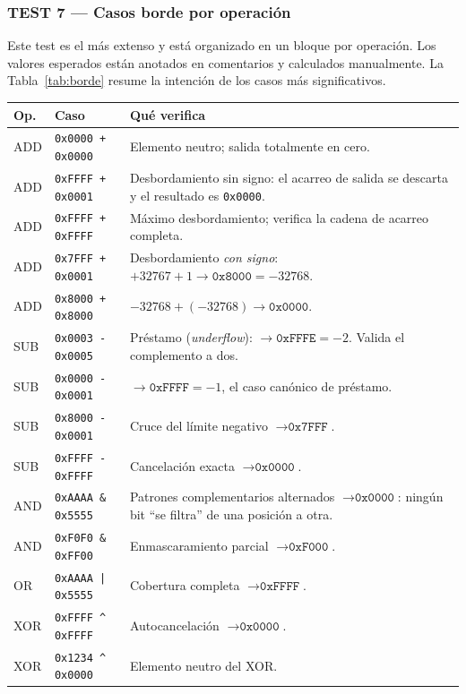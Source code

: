 \documentclass[12pt,a4paper]{article}
\begin{document}
\subsubsection{TEST 7 --- Casos borde por operación}

Este test es el más extenso y está organizado en un bloque por operación. Los
valores esperados están anotados en comentarios y calculados manualmente. La
Tabla~\ref{tab:borde} resume la intención de los casos más significativos.

\begin{longtable}{llp{7.4cm}}
  \toprule
  \textbf{Op.} & \textbf{Caso} & \textbf{Qué verifica} \\
  \midrule
  \endhead
  ADD & \texttt{0x0000 + 0x0000} & Elemento neutro; salida totalmente en cero. \\
  ADD & \texttt{0xFFFF + 0x0001} & Desbordamiento sin signo: el acarreo de salida se descarta y el resultado es \texttt{0x0000}. \\
  ADD & \texttt{0xFFFF + 0xFFFF} & Máximo desbordamiento; verifica la cadena de acarreo completa. \\
  ADD & \texttt{0x7FFF + 0x0001} & Desbordamiento \emph{con signo}: $+32767 + 1 \to \texttt{0x8000} = -32768$. \\
  ADD & \texttt{0x8000 + 0x8000} & $-32768 + (-32768) \to \texttt{0x0000}$. \\
  \midrule
  SUB & \texttt{0x0003 - 0x0005} & Préstamo (\emph{underflow}): $\to \texttt{0xFFFE} = -2$. Valida el complemento a dos. \\
  SUB & \texttt{0x0000 - 0x0001} & $\to \texttt{0xFFFF} = -1$, el caso canónico de préstamo. \\
  SUB & \texttt{0x8000 - 0x0001} & Cruce del límite negativo $\to \texttt{0x7FFF}$. \\
  SUB & \texttt{0xFFFF - 0xFFFF} & Cancelación exacta $\to \texttt{0x0000}$. \\
  \midrule
  AND & \texttt{0xAAAA \& 0x5555} & Patrones complementarios alternados $\to \texttt{0x0000}$: ningún bit ``se filtra'' de una posición a otra. \\
  AND & \texttt{0xF0F0 \& 0xFF00} & Enmascaramiento parcial $\to \texttt{0xF000}$. \\
  OR  & \texttt{0xAAAA | 0x5555} & Cobertura completa $\to \texttt{0xFFFF}$. \\
  XOR & \texttt{0xFFFF \^{} 0xFFFF} & Autocancelación $\to \texttt{0x0000}$. \\
  XOR & \texttt{0x1234 \^{} 0x0000} & Elemento neutro del XOR. \\

\end{longtable}
\end{document}
